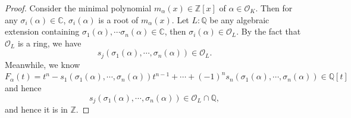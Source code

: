 \begin{proof}
    Consider the minimal polynomial $m_{\alpha}(x)\in \mathbb{Z}[x]$ of $\alpha \in \mathcal{O}_K$. Then for any $\sigma_i(\alpha) \in \mathbb{C}$, $\sigma_i(\alpha)$ is a root of $m_\alpha(x)$. Let $L:\mathbb{Q}$ be any algebraic extension containing $\sigma_1(\alpha),\cdots\sigma_n(\alpha) \in \mathbb{C}$, then $\sigma_i(\alpha)\in \mathcal{O}_L$. By the fact that $\mathcal{O}_L$ is a ring, we have $$s_j(\sigma_1(\alpha),\cdots ,\sigma_n(\alpha))\in \mathcal{O}_L.$$ 
    Meanwhile, we know $F_{\alpha}(t)=t^n-s_1(\sigma_1(\alpha),\cdots ,\sigma_n(\alpha))t^{n-1}+\cdots+(-1)^n s_n(\sigma_1(\alpha),\cdots ,\sigma_n(\alpha)) \in \mathbb{Q}[t]$ and hence $$s_j(\sigma_1(\alpha),\cdots,\sigma_n(\alpha))\in \mathcal{O}_L \cap \mathbb{Q},$$ 
    and hence it is in $\mathbb{Z}$.
\end{proof}

